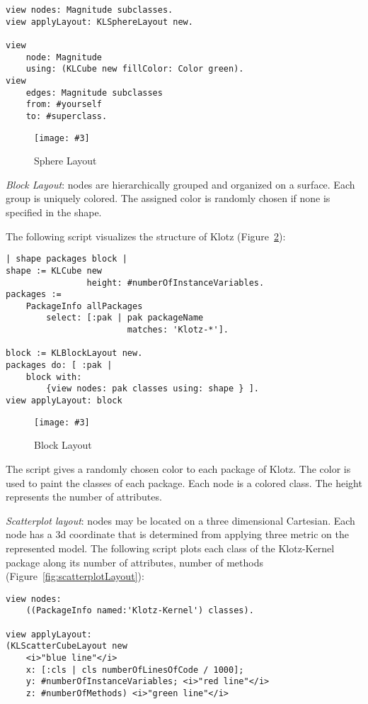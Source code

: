 \documentclass{sig-alternate}
\newcommand{\fig}[4]{
	\begin{figure}[#1]
		\centering
		\texttt{[image: \#3]}
		\caption{\label{fig:#3}#4}
	\end{figure}}
\newcommand{\figref}[1]{Figure~\ref{fig:#1}}
\begin{document}
\begin{lstlisting}
view nodes: Magnitude subclasses. 
view applyLayout: KLSphereLayout new. 

view 
	node: Magnitude 
	using: (KLCube new fillColor: Color green). 
view 
	edges: Magnitude subclasses 
	from: #yourself 
	to: #superclass.
\end{lstlisting}
\fig{}{0.4}{sphereLayout}{Sphere Layout}

\emph{Block Layout}: nodes are hierarchically grouped and organized on a surface. Each group is uniquely colored. The assigned color is randomly chosen if none is specified in the shape.


The following script visualizes the structure of Klotz (\figref{figure9.png}): 
\newpage
\begin{lstlisting}
| shape packages block |
shape := KLCube new 
				height: #numberOfInstanceVariables.
packages := 
	PackageInfo allPackages 
		select: [:pak | pak packageName 
						matches: 'Klotz-*'].

block := KLBlockLayout new.
packages do: [ :pak | 
	block with: 
		{view nodes: pak classes using: shape } ].
view applyLayout: block
\end{lstlisting}
\fig{}{0.4}{figure9.png}{Block Layout}

The script gives a randomly chosen color to each package of Klotz. The color is used to paint the classes of each package. Each node is a colored class. The height represents the number of attributes. 

\emph{Scatterplot layout}: nodes may be located on a three dimensional Cartesian. Each node has a 3d coordinate that is determined from applying three metric on the represented model. The following script plots each class of the Klotz-Kernel package along its number of attributes, number of methods (\figref{scatterplotLayout}):

\begin{lstlisting}
view nodes: 
	((PackageInfo named:'Klotz-Kernel') classes).

view applyLayout: 
(KLScatterCubeLayout new
    <i>"blue line"</i>
    x: [:cls | cls numberOfLinesOfCode / 1000]; 
    y: #numberOfInstanceVariables; <i>"red line"</i>
    z: #numberOfMethods) <i>"green line"</i>
\end{lstlisting}
\end{document}
